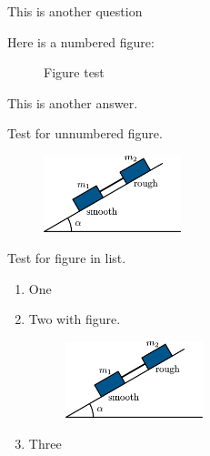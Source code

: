 \documentclass[solutionsatend]{ouunit}
\begin{document}
\lipsum[133]

\begin{exercise}\label{exe-fig-test}
This is another question
\begin{solution}
Here is a numbered figure:
\begin{figure}
\caption{Figure test \label{fig-placement-test}}
\end{figure}
This is another answer.
\end{solution}
\end{exercise}

Test for unnumbered figure.

\begin{figure}
\includegraphics[width=4cm]{test}
\end{figure}

Test for figure in list.
\begin{enumerate}
\item
One
\item
Two with figure.
\begin{figure}
\includegraphics[width=4cm]{test}
\end{figure}
\item
Three
\end{enumerate}
\end{document}
